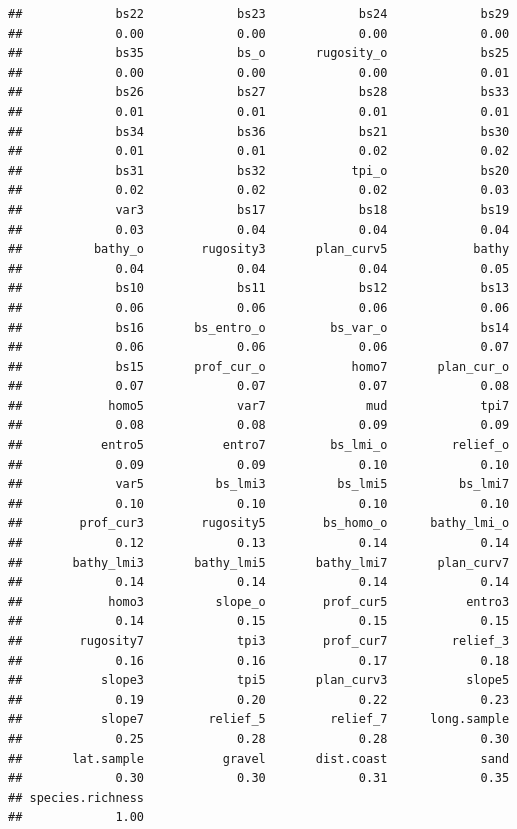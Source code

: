 \documentclass[
]{book}
\begin{document}
\begin{verbatim}
##             bs22             bs23             bs24             bs29 
##             0.00             0.00             0.00             0.00 
##             bs35             bs_o       rugosity_o             bs25 
##             0.00             0.00             0.00             0.01 
##             bs26             bs27             bs28             bs33 
##             0.01             0.01             0.01             0.01 
##             bs34             bs36             bs21             bs30 
##             0.01             0.01             0.02             0.02 
##             bs31             bs32            tpi_o             bs20 
##             0.02             0.02             0.02             0.03 
##             var3             bs17             bs18             bs19 
##             0.03             0.04             0.04             0.04 
##          bathy_o        rugosity3       plan_curv5            bathy 
##             0.04             0.04             0.04             0.05 
##             bs10             bs11             bs12             bs13 
##             0.06             0.06             0.06             0.06 
##             bs16       bs_entro_o         bs_var_o             bs14 
##             0.06             0.06             0.06             0.07 
##             bs15       prof_cur_o            homo7       plan_cur_o 
##             0.07             0.07             0.07             0.08 
##            homo5             var7              mud             tpi7 
##             0.08             0.08             0.09             0.09 
##           entro5           entro7         bs_lmi_o         relief_o 
##             0.09             0.09             0.10             0.10 
##             var5          bs_lmi3          bs_lmi5          bs_lmi7 
##             0.10             0.10             0.10             0.10 
##        prof_cur3        rugosity5        bs_homo_o      bathy_lmi_o 
##             0.12             0.13             0.14             0.14 
##       bathy_lmi3       bathy_lmi5       bathy_lmi7       plan_curv7 
##             0.14             0.14             0.14             0.14 
##            homo3          slope_o        prof_cur5           entro3 
##             0.14             0.15             0.15             0.15 
##        rugosity7             tpi3        prof_cur7         relief_3 
##             0.16             0.16             0.17             0.18 
##           slope3             tpi5       plan_curv3           slope5 
##             0.19             0.20             0.22             0.23 
##           slope7         relief_5         relief_7      long.sample 
##             0.25             0.28             0.28             0.30 
##       lat.sample           gravel       dist.coast             sand 
##             0.30             0.30             0.31             0.35 
## species.richness 
##             1.00
\end{verbatim}
\end{document}
